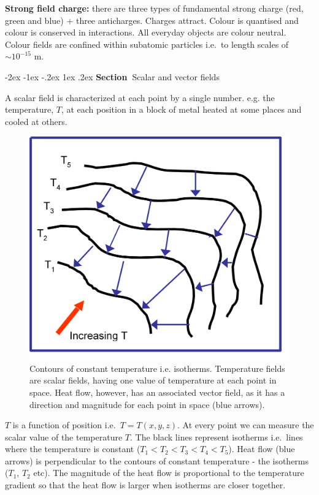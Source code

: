 \documentclass[
]{book}
\makeatletter
\renewcommand\section{%
\@startsection{section}{1}{\z@}%
              {-2ex \@plus -1ex \@minus -.2ex}%
              {1ex \@plus .2ex}%
              {\sffamily\bfseries\large\noindent Section~}}
\makeatother
\begin{document}
\textbf{Strong field charge:} there are three types of fundamental strong
charge (red, green and blue) + three anticharges. Charges attract.
Colour is quantised and colour is conserved in interactions. All
everyday objects are colour neutral. Colour fields are confined within
subatomic particles i.e.~to length scales of \(\sim 10^{-15}\) m.

\hypertarget{scalar-and-vector-fields}{%
\section{Scalar and vector fields}\label{scalar-and-vector-fields}}

A scalar field is characterized at each point by a single number. e.g.
the temperature, \(T\), at each position in a block of metal heated at
some places and cooled at others.

\begin{figure}

{\centering \includegraphics[width=0.7\linewidth]{Figures/isotherms} 

}

\caption{Contours of constant temperature i.e. isotherms. Temperature fields are scalar fields, having one value of temperature at each point in space. Heat flow, however, has an associated vector field, as it has a direction and magnitude for each point in space (blue arrows).}\label{fig:isotherms}
\end{figure}

\(T\) is a function of position i.e.~\(T = T(x,y,z)\). At every point we can
measure the scalar value of the temperature \(T\). The black lines
represent isotherms i.e.~lines where the temperature is constant
(\(T_1 < T_2 < T_3 < T_4 < T_5\)). Heat flow (blue arrows) is
perpendicular to the contours of constant temperature - the isotherms
(\(T_1\), \(T_2\) etc). The magnitude of the heat flow is proportional to
the temperature gradient so that the heat flow is larger when isotherms
are closer together.
\end{document}
